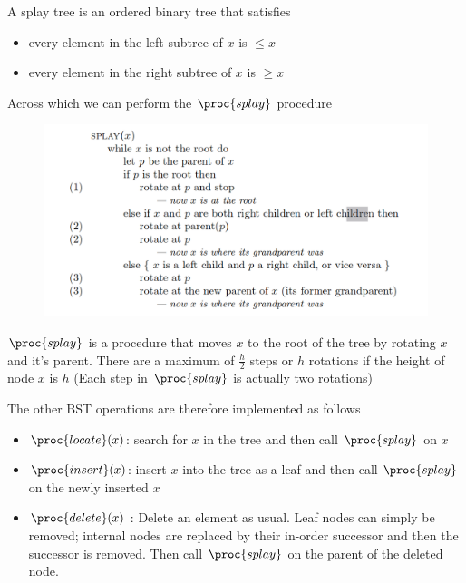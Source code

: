 \documentclass[../notes.tex]{subfiles}
\begin{document}
\begin{definition}
	A splay tree is an ordered binary tree that satisfies

	\begin{itemize}
		\item every element in the left subtree of $ x $ is $ \leq $$ x $
		\item every element in the right subtree of $ x $ is $ \ge  $$ x $
	\end{itemize}

	Across which we can perform the $ \proc{splay} $ procedure

	\begin{figure}[H]
		\centering
		\includegraphics[width=0.8\linewidth]{img/image_2022-11-25-20-07-14.png}
	\end{figure}

$ \proc{splay} $ is a procedure that moves $ x $ to the root of the tree by rotating $ x $ and it's parent. There are a maximum of $ \frac{h}{2} $ steps or $ h $ rotations if the height of node $ x $ is $ h $ (Each step in $ \proc{splay} $ is actually two rotations)

	The other BST operations are therefore implemented as follows

	\begin{itemize}
		\item \textbf{$ \proc{locate}(x) $}: search for $ x $ in the tree and then call $ \proc{splay} $ on $ x $
		\item \textbf{$ \proc{insert}(x) $}: insert $ x $ into the tree as a leaf and then call $ \proc{splay} $ on the newly inserted $ x $
		\item \textbf{$ \proc{delete}(x) $} : Delete an element as usual. Leaf nodes can simply be removed; internal nodes are replaced by their in-order successor and then the successor is removed. Then call $ \proc{splay} $ on the parent of the deleted node.
	\end{itemize}







\end{definition}
\end{document}
